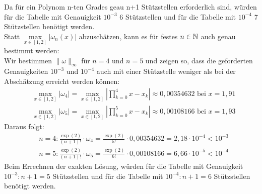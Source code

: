 Da für ein Polynom n-ten Grades geau n+1 Stützstellen erforderlich sind, würden für die Tabelle mit Genauigkeit $10^{-3}$ 6 Stützstellen und für die Tabelle mit $10^{-4}$ 7 Stützstellen benötigt werden.\\
\newline
Statt $\underset{x \in [1,2]}{\max}|\omega_n(x)|$ abzuschätzen, kann es für festes $n\in\mathbb N$ auch genau bestimmt werden:\\
Wir bestimmen $\|\omega\|_\infty$ für $n=4$ und $n=5$ und zeigen so, dass die geforderten Genauigkeiten $10^{-3}$ und $10^{-4}$ auch mit einer Stützstelle weniger als bei der Abschätzung erreicht werden können:
\begin{align*}
&\max_{x \in [1,2]}|\omega_4|=\max_{x \in [1,2]}\left|\prod_{k=0}^{4}x-x_k \right|\approx 0,00354632 \text{ bei } x=1,91\\
&\max_{x \in [1,2]}|\omega_5|=\max_{x \in [1,2]}\left|\prod_{k=0}^{5}x-x_k \right|\approx 0,00108166 \text{ bei } x=1,93
\end{align*}
Daraus folgt:
\begin{align*}
&n=4: \frac{\exp(2)}{(n+1)!}\cdot\omega_4=\frac{\exp(2)}{5!}\cdot 0,00354632 = 2,18 \cdot 10^{-4} < 10^{-3}\\
&n=5: \frac{\exp(2)}{(n+1)!}\cdot\omega_5=\frac{\exp(2)}{6!}\cdot 0,00108166 = 6,66 \cdot 10^{-5} < 10^{-4}
\end{align*}
Beim Errechnen der exakten Lösung, würden für die Tabelle mit Genauigkeit $10^{-3}: n+1=5$ Stützstellen und für die Tabelle mit $10^{-4}: n+1=6$ Stützstellen benötigt werden. 